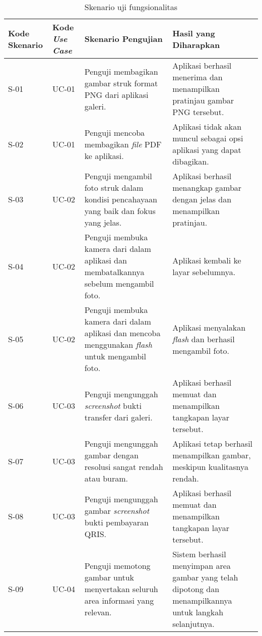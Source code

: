 \begin{table}[h!]
\caption{Skenario uji fungsionalitas}
\label{tab:skenario-uji-fungsional}
\begin{tabularx}{\linewidth}{|p{1.5cm}|p{1.5cm}|p{4.5cm}|X|}
\hline
\textbf{Kode Skenario} & \textbf{Kode \emph{Use Case}} & \textbf{Skenario Pengujian} & \textbf{Hasil yang Diharapkan} \\
\hline
S-01 & UC-01 & Penguji membagikan gambar struk format PNG dari aplikasi galeri. & Aplikasi berhasil menerima dan menampilkan pratinjau gambar PNG tersebut. \\
\hline
S-02 & UC-01 & Penguji mencoba membagikan \emph{file} PDF ke aplikasi. & Aplikasi tidak akan muncul sebagai opsi aplikasi yang dapat dibagikan. \\
\hline
S-03 & UC-02 & Penguji mengambil foto struk dalam kondisi pencahayaan yang baik dan fokus yang jelas. & Aplikasi berhasil menangkap gambar dengan jelas dan menampilkan pratinjau. \\
\hline
S-04 & UC-02 & Penguji membuka kamera dari dalam aplikasi dan membatalkannya sebelum mengambil foto. & Aplikasi kembali ke layar sebelumnya. \\
\hline
S-05 & UC-02 & Penguji membuka kamera dari dalam aplikasi dan mencoba menggunakan \emph{flash} untuk mengambil foto. & Aplikasi menyalakan \emph{flash} dan berhasil mengambil foto. \\
\hline
S-06 & UC-03 & Penguji mengunggah \emph{screenshot} bukti transfer dari galeri. & Aplikasi berhasil memuat dan menampilkan tangkapan layar tersebut. \\
\hline
S-07 & UC-03 & Penguji mengunggah gambar dengan resolusi sangat rendah atau buram. & Aplikasi tetap berhasil menampilkan gambar, meskipun kualitasnya rendah. \\
\hline
S-08 & UC-03 & Penguji mengunggah gambar \emph{screenshot} bukti pembayaran QRIS. & Aplikasi berhasil memuat dan menampilkan tangkapan layar tersebut.\\
\hline
S-09 & UC-04 & Penguji memotong gambar untuk menyertakan seluruh area informasi yang relevan. & Sistem berhasil menyimpan area gambar yang telah dipotong dan menampilkannya untuk langkah selanjutnya. \\
\hline

\end{tabularx}
\end{table}

